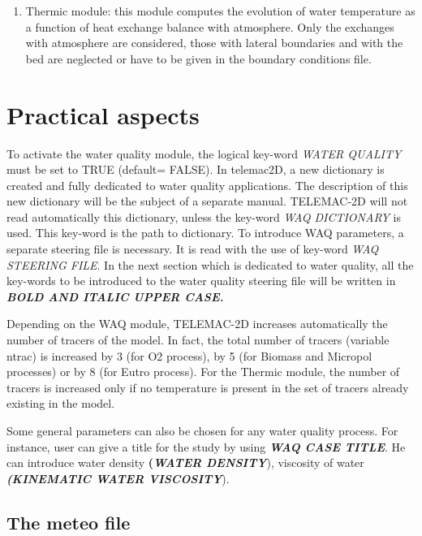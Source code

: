 \begin{enumerate}
\item  Thermic module: this module computes the evolution of water temperature as a function of heat exchange balance with atmosphere. Only the exchanges with atmosphere are considered, those with lateral boundaries and with the bed are neglected or have to be given in the boundary conditions file.
\end{enumerate}


\section{ Practical aspects}



 To activate the water quality module, the logical key-word \textit{WATER QUALITY} must be set to TRUE (default= FALSE).  In telemac2D, a new dictionary is created and fully dedicated to water quality applications. The description of this new dictionary will be the subject of a separate manual. TELEMAC-2D will not read automatically this dictionary, unless the key-word \textit{WAQ DICTIONARY} is used. This key-word is the path to dictionary. To introduce WAQ parameters, a separate steering file is necessary. It is read with the use of key-word \textit{WAQ STEERING FILE}. In the next section which is dedicated to water quality, all the key-words to be introduced to the water quality steering file will be written in \textbf{\textit{BOLD AND ITALIC UPPER CASE.}}

 Depending on the WAQ module, TELEMAC-2D increases automatically the number of tracers of the model. In fact, the total number of tracers (variable ntrac) is increased by 3 (for O2 process), by 5 (for Biomass and Micropol processes) or by 8 (for Eutro process). For the Thermic module, the number of tracers is increased only if no temperature is present in the set of tracers already existing in the model.

 Some general parameters can also be chosen for any water quality process. For instance, user can give a title for the study by using \textbf{\textit{WAQ CASE TITLE}}. He can introduce water density \textbf{(\textit{WATER DENSITY}}), viscosity of water \textbf{\textit{(KINEMATIC WATER VISCOSITY}}).


\subsection{  The meteo file}

